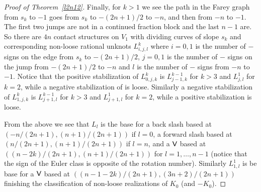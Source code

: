 \documentclass[11pt]{amsart}
\theoremstyle{plain}
\theoremstyle{definition}
\theoremstyle{remark}
\numberwithin{theorem}{section}
\begin{document}
\begin{proof}[Proof of Theorem~\ref{l2n12}]
Finally, for $k>1$ we see the path in the Farey graph from $s_k$ to $-1$ goes from $s_k$ to $-(2n+1)/2$ to $-n$, and then from $-n$ to $-1$. The first two jumps are not in a continued fraction block and the last  $n-1$ are. So there are $4n$ contact structures on $V_1$ with dividing curves of slope $s_k$ and corresponding non-loose rational unknots $L^k_{i, j,l}$ where $i=0,1$ is the number of $-$ signs on the edge from $s_k$ to $-(2n+1)/2$, $j=0,1$ is the number of $-$ signs on the jump from $-(2n+1)/2$ to $-n$ and $l$ is the number of $-$ signs from $-n$ to $-1$. Notice that the positive stabilization of $L^k_{0,j,k}$ is $L^{k-1}_{j-1,k}$ for $k>3$ and $L^1_{j,l}$ for $k=2$, while a negative stabilization of is loose. Similarly a negative stabilization of $L^k_{1,j,k}$ is $L^{k-1}_{j+1,l}$ for $k>3$ and $L^1_{j+1,l}$ for $k=2$, while a positive stabilization is loose. 

From the above we see that $L_l$ is the base for a back slash based at $(-n/(2n+1), (n+1)/(2n+1))$ if $l=0$, a forward slash based at $(n/(2n+1), (n+1)/(2n+1))$ if $l=n$, and a $\normalfont\textsf{V}$ based at $((n-2k)/(2n+1), (n+1)/(2n+1))$ for $l=1,\ldots, n-1$ (notice that the sign of the Euler class is opposite of the rotation number). Similarly $L^1_{1,l}$ is be base for a $\normalfont\textsf{V}$ based at $((n-1-2k)/(2n+1),(3n+2)/(2n+1))$ finishing the classification of non-loose realizations of $K_0$ (and $-K_0$). 


\end{proof}
\end{document}
